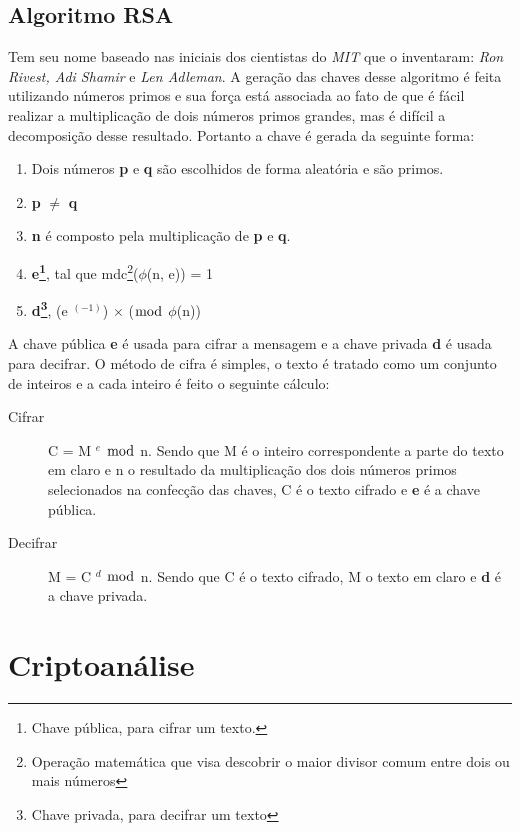 \subsection{Algoritmo RSA}
\label{algorithm-rsa}

Tem seu nome baseado nas iniciais dos cientistas do \textit{MIT} que o inventaram: \textit{Ron Rivest, Adi Shamir} e \textit{Len Adleman}. A geração das chaves desse algoritmo é feita utilizando números primos e sua força está associada ao fato de que é fácil realizar a multiplicação de dois números primos grandes, mas é difícil a decomposição desse resultado. Portanto a chave é gerada da seguinte forma:

\begin{enumerate}
\item Dois números \textbf{p} e \textbf{q} são escolhidos de forma aleatória e são primos.
\item \textbf{p} $\neq$ \textbf{q}
\item \textbf{n} é composto pela multiplicação de \textbf{p} e \textbf{q}.
\item \textbf{e\footnote{Chave pública, para cifrar um texto.}}, tal que mdc\footnote{Operação matemática que visa descobrir o maior divisor comum entre dois ou mais números}($\phi$(n, e)) = 1
\item \textbf{d\footnote{Chave privada, para decifrar um texto }}, (e $^ {(-1)}$) $\times$ ($\bmod$ $\phi$(n)) 
\end{enumerate}

%
A chave pública \textbf{e}  é usada para cifrar a mensagem e a chave privada \textbf{d} é usada para decifrar. O método de cifra é simples, o texto é tratado como um conjunto de inteiros e a cada inteiro é feito o seguinte cálculo:

\begin{description}
\item [Cifrar]
C = M $^ e$ $\bmod$ n. Sendo que M é o inteiro correspondente a parte do texto em claro e n o resultado da multiplicação dos dois números primos selecionados na confecção  das chaves, C é o texto cifrado e \textbf{e} é a chave pública. 
\item [Decifrar]
M = C $^ d$ $\bmod$ n. Sendo que C é o texto cifrado, M o texto em claro e \textbf{d} é a chave privada.
\end{description}

%
\section{Criptoanálise}
\label{cryptanalysis}

